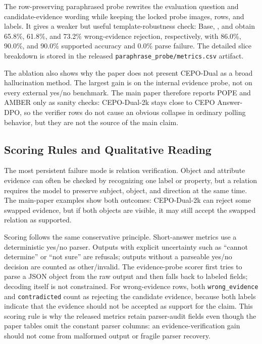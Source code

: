 The row-preserving paraphrased probe rewrites the evaluation question and
candidate-evidence wording while keeping the locked probe images, rows, and
labels. It gives a weaker but useful template-robustness check: Base,
\answerdpo{}, and \dualtwok{} obtain 65.8\%, 61.8\%, and 73.2\%
wrong-evidence rejection, respectively, with 86.0\%, 90.0\%, and 90.0\%
supported accuracy and 0.0\% parse failure. The detailed slice breakdown is
stored in the released \texttt{paraphrase\_probe/metrics.csv} artifact.

The ablation also shows why the paper does not present CEPO-Dual as a broad
hallucination method. The largest gain is on the internal evidence probe, not
on every external yes/no benchmark. The main paper therefore reports POPE and
AMBER only as sanity checks: CEPO-Dual-2k stays close to CEPO Answer-DPO, so
the verifier rows do not cause an obvious collapse in ordinary polling
behavior, but they are not the source of the main claim.

\subsection{Scoring Rules and Qualitative Reading}

The most persistent failure mode is relation verification. Object and
attribute evidence can often be checked by recognizing one label or property,
but a relation requires the model to preserve subject, object, and direction
at the same time. The main-paper examples show both outcomes: CEPO-Dual-2k can
reject some swapped evidence, but if both objects are visible, it may still
accept the swapped relation as supported.

Scoring follows the same conservative principle. Short-answer metrics use a
deterministic yes/no parser. Outputs with explicit uncertainty such as
``cannot determine'' or ``not sure'' are refusals; outputs without a parseable
yes/no decision are counted as other/invalid. The evidence-probe scorer first
tries to parse a JSON object from the raw output and then falls back to labeled
fields; decoding itself is not constrained. For wrong-evidence
rows, both \texttt{wrong\_evidence} and \texttt{contradicted} count as
rejecting the candidate evidence, because both labels indicate that the
evidence should not be accepted as support for the claim. This scoring rule is
why the released metrics retain parser-audit fields even though the paper
tables omit the constant parser columns: an evidence-verification gain should
not come from malformed output or fragile parser recovery.

